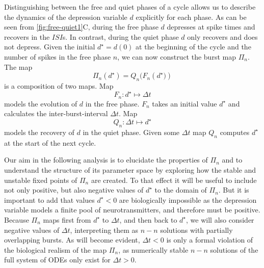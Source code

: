 \documentclass[utf8,draft]{frontiersFPHY} %
\newcommand{\dstar}{d^\star}
\newcommand{\delt}{\Delta t}
\begin{document}
Distinguishing between the free and quiet phases of a cycle allows us to describe the dynamics of the depression variable $d$ explicitly for each phase.
As can be seen from \cref{fig:free-quiet1}C, during the free phase $d$ depresses at spike times and recovers in the $ISI$s.
In contrast, during the quiet phase $d$ only recovers and does not depress.
Given the initial $d^{\star}=d(0)$ at the beginning of the cycle and the number of spikes in the free phase $n$, we can now construct the burst map $\Pi_{n}$.
The map
\begin{equation}
  \Pi_{n}(d^{\star})=Q_{n}\big(F_{n}(d^{\star}\big))
\end{equation}
\noindent
is a composition of two maps.
Map
\begin{equation}
  F_{n}:d^{\star}\mapsto \delt
\end{equation}
models the evolution of $d$ in the free phase.
$F_{n}$ takes an initial value $d^{\star}$ and calculates the inter-burst-interval $\delt$.
Map
\begin{equation}
  Q_{n}:\delt \mapsto d^{\star}
\end{equation}
models the recovery of $d$ in the quiet phase.
Given some $\delt$ map $Q_n$ computes $\dstar$ at the start of the next cycle.

Our aim in the following analysis is to elucidate the properties of $\Pi_{n}$ and to understand the structure of its parameter space by exploring how the stable and unstable fixed points of $\Pi_{n}$ are created.
To that effect it will be useful to include not only positive, but also negative values of $d^{\star}$ to the domain of $\Pi_{n}$.
But it is important to add that values $d^{\star}<0$ are biologically impossible as the depression variable models a finite pool of neurotransmitters, and therefore must be positive.
Because $\Pi_{n}$ maps first from $d^{\star}$ to $\delt$, and then back to $d^{\star}$, we will also consider negative values of $\Delta t$, interpreting them as $n-n$ solutions with partially overlapping bursts.
As will become evident, $\delt<0$ is only a formal violation of the biological realism of the map $\Pi_{n}$, as numerically stable $n-n$ solutions of the full system of ODEs only exist for $\Delta t>0$.
\end{document}
